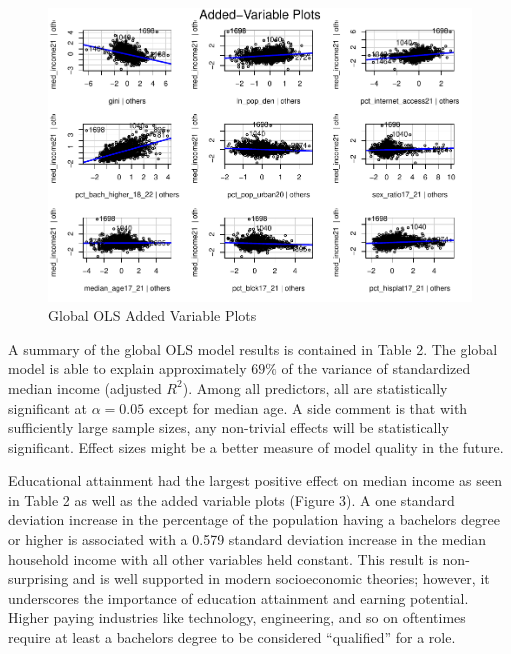 \documentclass[
]{article}
\begin{document}
\begin{figure}[H]

{\centering \includegraphics[width=1\linewidth]{final-project-write-up-nathan-nguyen_files/figure-latex/unnamed-chunk-6-1} 

}

\caption{Global OLS Added Variable Plots}\label{fig:unnamed-chunk-6}
\end{figure}

A summary of the global OLS model results is contained in Table 2. The
global model is able to explain approximately \(69\%\) of the variance
of standardized median income (adjusted \(R^{2}\)). Among all
predictors, all are statistically significant at \(\alpha = 0.05\)
except for median age. A side comment is that with sufficiently large
sample sizes, any non-trivial effects will be statistically significant.
Effect sizes might be a better measure of model quality in the future.

Educational attainment had the largest positive effect on median income
as seen in Table 2 as well as the added variable plots (Figure 3). A one
standard deviation increase in the percentage of the population having a
bachelors degree or higher is associated with a 0.579 standard deviation
increase in the median household income with all other variables held
constant. This result is non-surprising and is well supported in modern
socioeconomic theories; however, it underscores the importance of
education attainment and earning potential. Higher paying industries
like technology, engineering, and so on oftentimes require at least a
bachelors degree to be considered ``qualified'' for a role.
\end{document}
